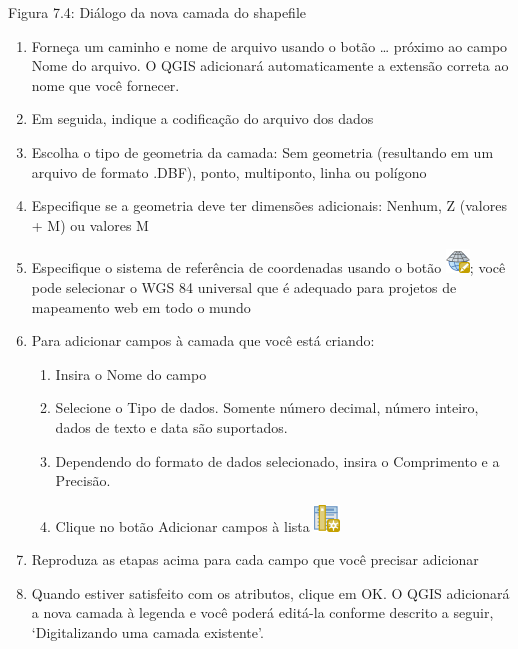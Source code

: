 \documentclass[
]{krantz}
\providecommand{\tightlist}{%
  \setlength{\itemsep}{0pt}\setlength{\parskip}{0pt}}
\begin{document}
Figura 7.4: Diálogo da nova camada do shapefile

\begin{enumerate}
\def\labelenumi{\arabic{enumi}.}
\setcounter{enumi}{1}
\item
  Forneça um caminho e nome de arquivo usando o botão \ldots{} próximo ao campo Nome do arquivo. O QGIS adicionará automaticamente a extensão correta ao nome que você fornecer.
\item
  Em seguida, indique a codificação do arquivo dos dados
\item
  Escolha o tipo de geometria da camada: Sem geometria (resultando em um arquivo de formato .DBF), ponto, multiponto, linha ou polígono
\item
  Especifique se a geometria deve ter dimensões adicionais: Nenhum, Z (valores + M) ou valores M
\item
  Especifique o sistema de referência de coordenadas usando o botão \includegraphics{media/modulo7/mActionSetProjection.png}; você pode selecionar o WGS 84 universal que é adequado para projetos de mapeamento web em todo o mundo
\item
  Para adicionar campos à camada que você está criando:

  \begin{enumerate}
  \def\labelenumii{\arabic{enumii}.}
  \tightlist
  \item
    Insira o Nome do campo
  \item
    Selecione o Tipo de dados. Somente número decimal, número inteiro, dados de texto e data são suportados.
  \item
    Dependendo do formato de dados selecionado, insira o Comprimento e a Precisão.
  \item
    Clique no botão Adicionar campos à lista \includegraphics{media/modulo7/mActionNewAttribute.png}
  \end{enumerate}
\item
  Reproduza as etapas acima para cada campo que você precisar adicionar
\item
  Quando estiver satisfeito com os atributos, clique em OK. O QGIS adicionará a nova camada à legenda e você poderá editá-la conforme descrito a seguir, `Digitalizando uma camada existente'.
\end{enumerate}
\end{document}
